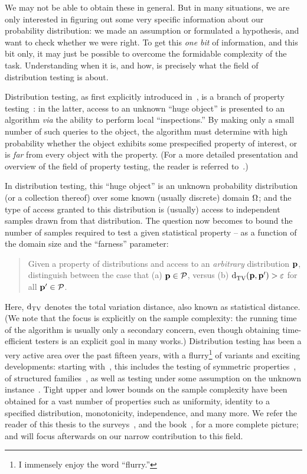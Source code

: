 We may not be able to obtain these in general. But in many situations, we are only interested in figuring out some very specific information about our probability distribution: we made an assumption or formulated a hypothesis, and want to check whether we were right. To get this \emph{one bit} of information, and this bit only, it may just be possible to overcome the formidable complexity of the task. Understanding when it is, and how, is precisely what the field of distribution testing is about.

Distribution testing, as first explicitly introduced in~\cite{BFRSW:00}, is a branch of property testing~\cite{RS:96,GGR:98}: in the latter, access to an unknown ``huge object'' is presented to an algorithm \textit{via} the ability to perform local ``inspections.'' By making only a small number of such queries to the object, the algorithm must determine with high probability whether the object exhibits some prespecified property of interest, or is \emph{far} from every object with the property. (For a more detailed presentation and overview of the field of property testing, the reader is referred to~\cite{Fischer:01,Ron:08,Ron:10,Goldreich:10,Gol:17,BY:17}.)

In distribution testing, this ``huge object'' is an unknown probability distribution (or a collection thereof) over some known (usually discrete) domain ${\Omega}$; and the type of access granted to this distribution is (usually) access to independent samples drawn from that distribution. The question now becomes to bound the number of samples required to test a given statistical property -- as a function of the domain size and the ``farness'' parameter:
\begin{quote}
Given a property of distributions \property and access to an \emph{arbitrary} distribution $\mathbf{p}$, distinguish between the case that \textsf{(a)} $\mathbf{p}\in\mathcal{P}$, versus \textsf{(b)} ${\operatorname{d}_{\rm{TV}}^{}\!\left({\mathbf{p}, \mathbf{p}^\prime}\right)} >\varepsilon$ for all $\mathbf{p}^\prime\in\mathcal{P}$.
\end{quote}
Here, $\operatorname{d}_{\rm{TV}}$ denotes the total variation distance, also known as statistical distance. (We note that the focus is explicitly on the sample complexity: the running time of the algorithm is usually only a secondary concern, even though obtaining time-efficient testers is an explicit goal in many works.) Distribution testing has been a very active area over the past fifteen years, with a flurry\footnote{I immensely enjoy the word ``flurry.''}{} of variants and exciting developments: starting with~\cite{GRexp:00,BFRSW:10,BFFKRW:01}, this includes the testing of symmetric properties~\cite{RRSS:09,Valiant:11,VV:11:stoc,ValiantValiant:11}, of structured families~\cite{BKR:04,ILR:12,AD:15,Canonne:15,ADK:15,CDGR:16,Canonne:16}, as well as testing under some assumption on the unknown instance~\cite{RS:09,DDSVV:13,DKN:15,DKN:15:FOCS}. Tight upper and lower bounds on the sample complexity have been obtained for a vast number of properties such as uniformity, identity to a specified distribution, monotonicity, independence, and many more. We refer the reader of this thesis to the surveys~\cite{Rubinfeld:12:Survey,Canonne:15:Survey}, and the book~\cite{Gol:17}, for a more complete picture; and will focus afterwards on our narrow contribution to this field.

